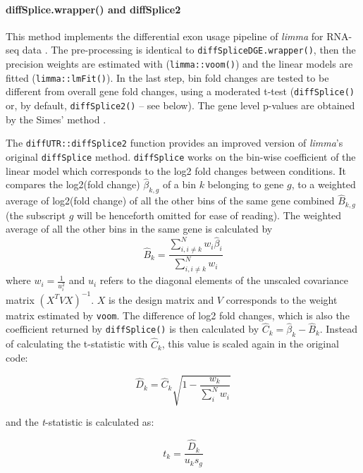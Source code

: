 \documentclass{bmcart}
\begin{document}
\paragraph{diffSplice.wrapper() and diffSplice2}
\label{sec:diffSplice2}
This method implements the differential exon usage pipeline of \textit{limma} for RNA-seq data \cite{Ritchie2015LimmaStudies}. The pre-processing is identical to \texttt{diffSpliceDGE.wrapper()}, then the precision weights are estimated with (\texttt{limma::voom()}) and the linear models are fitted (\texttt{limma::lmFit()}). In the last step, bin fold changes are tested to be different from overall gene fold changes, using a moderated t-test (\texttt{diffSplice()} or, by default, \texttt{diffSplice2()} -- see below). The gene level p-values are obtained by the Simes' method \cite{Simes1986AnSignificance}.

The \texttt{diffUTR::diffSplice2} function provides an improved version of \textit{limma}'s original \texttt{diffSplice} method. \texttt{diffSplice} works on the bin-wise coefficient of the linear model which corresponds to the log2 fold changes between conditions. It compares the log2(fold change) $\hat{\beta}_{k,g}$ of a bin $k$ belonging to gene $g$, to a weighted average of log2(fold change) of all the other bins of the same gene combined $\hat{B}_{k,g}$ (the subscript $g$ will be henceforth omitted for ease of reading). The weighted average of all the other bins in the same gene is calculated by
\begin{equation}
    \hat{B}_{k}= \frac{\sum_{i, i\neq k}^{N}{w_{i} \hat{\beta}_{i}}}{\sum_{i, i\neq k}^{N}w_{i}}
\end{equation}
where $w_{i}=\frac{1}{u_{i}^2}$ and $u_{i}$ refers to the diagonal elements of the unscaled covariance matrix $(X^TVX)^{-1}$. $X$ is the design matrix and $V$ corresponds to the weight matrix estimated by \texttt{voom}. The difference of log2 fold changes, which is also the coefficient returned by \texttt{diffSplice()} is then calculated by $\hat{C}_{k} = \hat{\beta}_{k} - \hat{B}_{k}$. Instead of calculating the t-statistic with $\hat{C}_{k}$, this value is scaled again in the original code:

\begin{equation}
    \hat{D}_{k} =\hat{C}_{k}\sqrt{1-\frac{{w}_{k}}{\sum_{i}^{N}w_{i}}}
\end{equation}

and the \textit{t}-statistic is calculated as:

\begin{equation}
    t_{k} =\frac{\hat{D}_{k}}{u_{k}s_{g}}
\end{equation}
\end{document}
